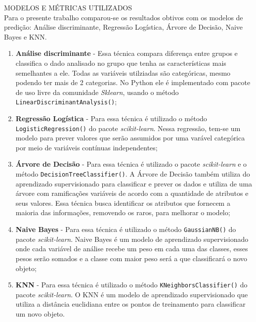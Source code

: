 
\noindent \textcolor{COLOR2}{MODELOS E MÉTRICAS UTILIZADOS}
\\

Para o presente trabalho comparou-se os resultados obtivos com os modelos de predição: Análise discriminante, Regressão Logística, Árvore de Decisão, Naive Bayes e KNN.

\begin{enumerate}
    \item \textbf{Análise discriminante} - Essa técnica compara diferença entre grupos e classifica o dado analisado no grupo que tenha as características mais semelhantes a ele. Todas as variáveis utilziadas são categóricas, mesmo podendo ter mais de 2 categorias. No Python ele é implementado com pacote de uso livre da comunidade \textit{Sklearn}, usando o método \textcolor{COLOR1}{\texttt{LinearDiscriminantAnalysis()}};
    \item \textbf{Regressão Logística} - Para essa técnica é utilizado o método \textcolor{COLOR1}{\texttt{LogisticRegression()}} do pacote \textit{scikit-learn}. Nessa regressão, tem-se um modelo para prever valores que serão assumidos por uma varável categórica por meio de variáveis contínuas independentes;
    \item \textbf{Árvore de Decisão} - Para essa técnica é utilizado o pacote \textit{scikit-learn} e o método \textcolor{COLOR1}{\texttt{DecisionTreeClassifier()}}. A Árvore de Decisão também utiliza do aprendizado supervisionado para classificar e prever os dados e utiliza de uma árvore com ramificações variáveis de acordo com a quantidade de atributos e seus valores. Essa técnica busca identificar os atributos que fornecem a maioria das informações, removendo os raros, para melhorar o modelo;
    \item \textbf{Naive Bayes} - Para essa técnica é utilizado o método \textcolor{COLOR1}{\texttt{GaussianNB()}} do pacote \textit{scikit-learn}. Naive Bayes é um modelo de aprendizado supervisionado onde cada variável de análise recebe um peso em cada uma das classes, esses pesos serão somados e a classe com maior peso será a que classificará o novo objeto;
    \item \textbf{KNN} - Para essa técnica é utilizado o método \textcolor{COLOR1}{\texttt{KNeighborsClassifier()}} do pacote \textit{scikit-learn}. O KNN é um modelo de aprendizado supervisionado que utiliza a distância euclidiana entre os pontos de treinamento para classificar um novo objeto.
\end{enumerate}

